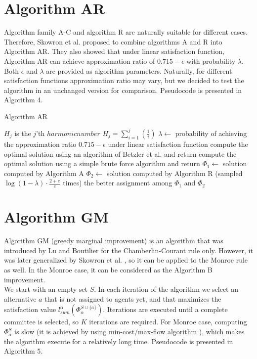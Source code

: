 \section{Algorithm AR}

Algorithm family A-C and algorithm R are naturally suitable for different cases. Therefore, Skowron et al. \cite{1} proposed to combine algorithms A and R into Algorithm AR. They also showed that under linear satisfaction function, Algorithm AR can achieve approximation ratio of $0.715 - \epsilon$ with probability $\lambda$. Both $\epsilon$ and $\lambda$ are provided as algorithm parameters. Naturally, for different satisfaction functions approximation ratio may vary, but we decided to test the algorithm in an unchanged version for comparison. Pseudocode is presented in Algorithm 4.

\begin{algorithm}
\caption{Algorithm AR}\label{euclid}
\begin{algorithmic}[1]
		\State $H_{j}$ is the $j$'th $harmonic number$ $H_{j} = \sum_{i=1}^{j}(\frac{1}{i})$
		\State $\lambda \gets$ probability of achieving the approximation ratio $0.715 - \epsilon$ under linear satisfaction function
			\State compute the optimal solution using an algorithm of Betzler et al. \cite{3} and return
		\EndIf
			\State compute the optimal solution using a simple brute force algorithm and return
		\EndIf
		\State $\Phi_{1} \gets$ solution computed by Algorithm A
		\State $\Phi_{2} \gets$ solution computed by Algorithm R (sampled $\log (1 - \lambda) \cdot \frac{2 + e}{e}$ times)
		\State \Return the better assignment among $\Phi_{1}$ and $\Phi_{2}$
	\EndProcedure
\end{algorithmic}
\end{algorithm}

\section{Algorithm GM}

Algorithm GM (greedy marginal improvement) is an algorithm that was introduced by Lu and Boutilier \cite{4} for the Chamberlin-Courant rule only. However, it was later generalized by Skowron et al. \cite{1}, so it can be applied to the Monroe rule as well. In the Monroe case, it can be considered as the Algorithm B improvement.
\\

We start with an empty set $S$. In each iteration of the algorithm we select an alternative $a$ that is not assigned to agents yet, and that maximizes the satisfaction value $l_{sum}^{\alpha}(\Phi^{S \cup \{a\}}_{\alpha})$. Iterations are executed until a complete committee is selected, so $K$ iterations are required. For Monroe case, computing $\Phi^{S}_{\alpha}$ is slow (it is achieved by using min-cost/max-flow algorithm \cite{3}), which makes the algorithm execute for a relatively long time. Pseudocode is presented in Algorithm 5.
\\

